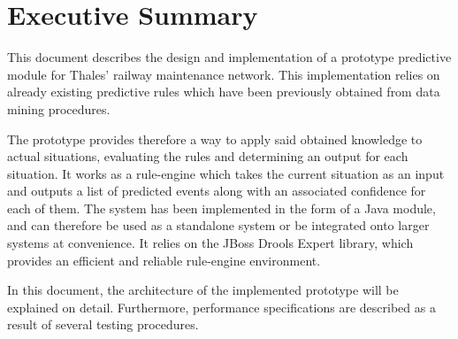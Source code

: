 \documentclass[a4paper,12pt]{article}
\begin{document}
\newcommand\litem[1]{\item{\bfseries #1 }}
\renewcommand{\arraystretch}{1.5} %

\newcommand\headcell[1]{%
  \multicolumn{1}{c|}{\cellcolor{MidnightBlue}\bfseries\sffamily\textcolor{white}{#1}}
}

%

\onehalfspacing



\section*{Executive Summary}
This document describes the design and implementation of a prototype predictive module for Thales' railway maintenance network. This implementation relies on already existing predictive rules which have been previously obtained from data mining procedures.

The prototype provides therefore a way to apply said obtained knowledge to actual situations, evaluating the rules and determining an output for each situation. It works as a rule-engine which takes the current situation as an input and outputs a list of predicted events along with an associated confidence for each of them. The system has been implemented in the form of a Java module, and can therefore be used as a standalone system or be integrated onto larger systems at convenience. It relies on the JBoss Drools Expert library, which provides an efficient and reliable rule-engine environment.

In this document, the architecture of the implemented prototype will be explained on detail. Furthermore, performance specifications are described as a result of several testing procedures.


\newpage
\tableofcontents %
\cleardoublepage
{} %
\listoffigures %
\end{document}
